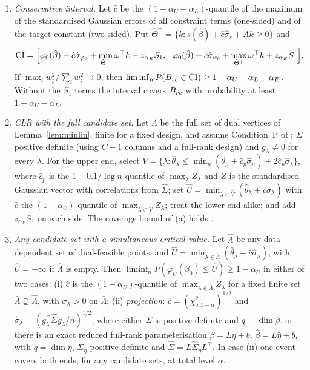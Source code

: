 \begin{theorem}\label{thm:ci}
\begin{enumerate}[label=(\alph*)]
\item {} \emph{Conservative interval.} Let $\hat c$ be the
$(1-\alpha_U-\alpha_L)$-quantile of the maximum of the standardised Gaussian errors of
all constraint terms (one-sided) and of the target constant (two-sided). Put
$\hat\Theta^+=\{k:s(\hat\beta)+\hat c\hat\sigma_s+Ak\ge0\}$ and
\[
\mathrm{CI}=\Big[\varphi_0(\hat\beta)-\hat c\hat\sigma_{\varphi_0}+\min_{\hat\Theta^+}\omega^\top k-z_{\alpha_E}S_1,\ \
\varphi_0(\hat\beta)+\hat c\hat\sigma_{\varphi_0}+\max_{\hat\Theta^+}\omega^\top k+z_{\alpha_E}S_1\Big].
\]
If $\max_iw_i^2/\sum_iw_i^2\to0$, then
$\liminf_nP(B_{rc}\in\mathrm{CI})\ge1-\alpha_U-\alpha_L-\alpha_E$. Without the $S_1$ terms
the interval covers $\tilde B_{rc}$ with probability at least $1-\alpha_U-\alpha_L$.
\item[(b1)] \status{cited} \emph{CLR with the full candidate set.} Let $\Lambda$ be
the full set of dual vertices of Lemma~\ref{lem:minlin}, finite for a fixed
design, and assume Condition~P of \citet{clr2013}: $\Sigma$ positive definite
(using $C-1$ columns and a full-rank design) and $g_\lambda\ne0$ for every
$\lambda$. For the upper end, select
$\hat V=\{\lambda:\hat\theta_\lambda\le\min_\mu(\hat\theta_\mu+\hat c_p\hat\sigma_\mu)+2\hat c_p\hat\sigma_\lambda\}$,
where $\hat c_p$ is the $1-0.1/\log n$ quantile of $\max_\lambda Z_\lambda$ and $Z$ is
the standardised Gaussian vector with correlations from $\hat\Sigma$; set
$\hat U=\min_{\lambda\in\hat V}(\hat\theta_\lambda+\hat c\hat\sigma_\lambda)$ with $\hat c$
the $(1-\alpha_U)$-quantile of $\max_{\lambda\in\hat V}Z_\lambda$; treat the lower end
alike; and add $z_{\alpha_E}S_1$ on each side. The coverage bound of (a) holds
\citep[Theorem~4]{clr2013}.
\item[(b2)]  \emph{Any candidate set with a simultaneous critical
value.} Let $\hat\Lambda$ be any data-dependent set of dual-feasible points, and
$\hat U=\min_{\lambda\in\hat\Lambda}(\hat\theta_\lambda+\hat c\hat\sigma_\lambda)$, with
$\hat U=+\infty$ if $\hat\Lambda$ is empty. Then
$\liminf_nP(\varphi_U(\beta_0)\le\hat U)\ge1-\alpha_U$ in either of two cases:
(i) $\hat c$ is the $(1-\alpha_U)$-quantile of $\max_{\lambda\in\bar\Lambda}Z_\lambda$
for a fixed finite set $\bar\Lambda\supseteq\hat\Lambda$, with $\sigma_\lambda>0$ on
$\bar\Lambda$; (ii) \emph{projection}: $\hat c=(\chi^2_{q,1-\alpha})^{1/2}$ and
$\hat\sigma_\lambda=(g_\lambda^\top\hat\Sigma g_\lambda/n)^{1/2}$, where either
$\Sigma$ is positive definite and $q=\dim\beta$, or there is an exact reduced
full-rank parameterisation $\beta=L\eta+b$, $\hat\beta=L\hat\eta+b$, with $q=\dim\eta$,
$\Sigma_\eta$ positive definite and $\hat\Sigma=L\hat\Sigma_\eta L^\top$. In case
(ii) one event covers both ends, for any candidate sets, at total level $\alpha$.
\end{enumerate}
\end{theorem}

